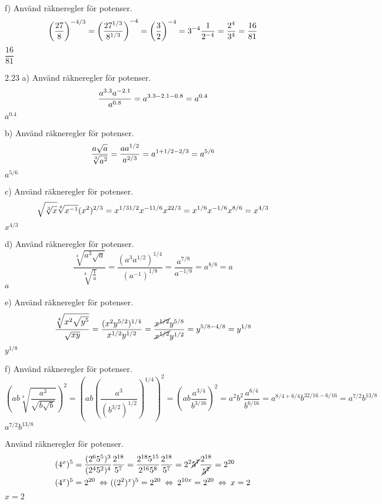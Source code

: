 \begin{task}{f)}
	Använd räkneregler för potenser.
	\[\left(\frac{27}{8}\right)^{-4/3}=
	\left(\frac{27^{1/3}}{8^{1/3}}\right)^{-4}=
	\left(\frac{3}{2}\right)^{-4}=
	3^{-4}\*\frac{1}{2^{-4}}=
	\frac{2^4}{3^4}=
	\frac{16}{81}\]
	\ans $\dfrac{16}{81}$
\end{task}

\begin{task}{2.23 a)}
	Använd räkneregler för potenser.
	\[\frac{a^{3.3}\*a^{-2.1}}{a^{0.8}}=a^{3.3-2.1-0.8}=a^{0.4}\]
	\ans $a^{0.4}$
\end{task}

\begin{task}{b)}
	Använd räkneregler för potenser.
	\[\dfrac{a\sqrt{a}}{\sqrt[3]{a^2}}=
	\dfrac{a\*a^{1/2}}{a^{2/3}}=
	a^{1+1/2-2/3}=
	a^{5/6}\]
	\ans $a^{5/6}$
\end{task}

\begin{task}{c)}
	Använd räkneregler för potenser.
	\[\sqrt{\sqrt[3]{x}}\*\sqrt[6]{x^{-1}}\*(x^2)^{2/3}=
	x^{1/3\*1/2}\*x^{-1\*1/6}\*x^{2\*2/3}=
	x^{1/6}\*x^{-1/6}\*x^{8/6}=
	x^{4/3}\]
	\ans $x^{4/3}$
\end{task}

\begin{task}{d)}
	Använd räkneregler för potenser.
	\[\dfrac{\sqrt[4]{a^3\sqrt{a}}}{\sqrt[8]{\frac{1}{a}}}=
	\dfrac{(a^3a^{1/2})^{1/4}}{(a^{-1})^{1/8}}=
	\dfrac{a^{7/8}}{a^{-1/8}}=
	a^{8/8}=
	a\]
	\ans $a$
\end{task}

\begin{task}{e)}
	Använd räkneregler för potenser.
	\[\dfrac{\sqrt[4]{x^2\sqrt{y^5}}}{\sqrt{xy}}=
	\dfrac{(x^2y^{5/2})^{1/4}}{x^{1/2}y^{1/2}}=
	\dfrac{\cancel{x^{1/2}}y^{5/8}}{\cancel{x^{1/2}}y^{1/2}}=
	y^{5/8-4/8}=
	y^{1/8}\]
	\ans $y^{1/8}$
\end{task}

\begin{task}{f)}
	Använd räkneregler för potenser.
	\[\left(ab\sqrt[4]{\dfrac{a^3}{\sqrt{b\sqrt{b}}}}\right)^2=
	\left(ab\left(\dfrac{a^3}{(b^{3/2})^{1/2}}\right)^{1/4}\right)^2=
	\left(ab\dfrac{a^{3/4}}{b^{3/16}}\right)^2=
	a^2b^2\dfrac{a^{6/4}}{b^{6/16}}=
	a^{8/4+6/4}b^{32/16-6/16}=
	a^{7/2}b^{13/8}\]
	\ans $a^{7/2}b^{13/8}$
\end{task}

\begin{task}{2.24}
	Använd räkneregler för potenser.
	\begin{align*}
	& (4^x)^5=\dfrac{(2^6\*5^5)^3}{(2^4\*5^2)^4}\*\dfrac{2^{18}}{5^7}= \dfrac{2^{18}\*5^{15}}{2^{16}\*5^8}\*\dfrac{2^{18}}{5^7}=
	2^2\*\cancel{5^7}\*\dfrac{2^{18}}{\cancel{5^7}}=
	2^{20} \\
	& (4^x)^5=2^{20} \lra
	((2^2)^x)^5=2^{20} \lra
	2^{10x}=2^{20} \lra x=2
	\end{align*}
	\ans $x=2$
\end{task}

